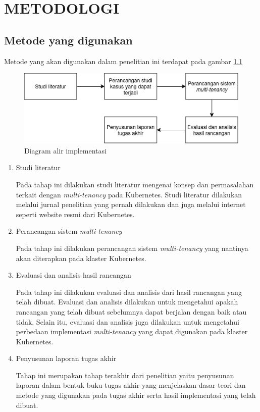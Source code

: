 \chapter{METODOLOGI}

\section{Metode yang digunakan}

Metode yang akan digunakan dalam penelitian ini terdapat pada gambar \ref{fig:Flowchart}

\begin{figure} [H] \centering
  \includegraphics[scale=0.7]{gambar/flowchart.png}
  \caption{Diagram alir implementasi}
  \label{fig:Flowchart}
\end{figure}

\begin{enumerate}
  \item{Studi literatur}
  \par{Pada tahap ini dilakukan studi literatur mengenai konsep dan permasalahan terkait
    dengan \emph{multi-tenancy} pada Kubernetes. Studi literatur dilakukan melalui jurnal penelitian
    yang pernah dilakukan dan juga melalui internet seperti website resmi dari Kubernetes.
  }

  \item{Perancangan sistem \emph{multi-tenancy}}
  \par{Pada tahap ini dilakukan perancangan sistem \emph{multi-tenancy} yang nantinya
    akan diterapkan pada klaster Kubernetes.
  }

  \item{Evaluasi dan analisis hasil rancangan}
  \par{Pada tahap ini dilakukan evaluasi dan analisis dari hasil rancangan yang telah
    dibuat. Evaluasi dan analisis dilakukan untuk mengetahui apakah rancangan yang
    telah dibuat sebelumnya dapat berjalan dengan baik atau tidak. Selain itu, evaluasi
    dan analisis juga dilakukan untuk mengetahui perbedaan implementasi \emph{multi-tenancy}
    yang dapat digunakan pada klaster Kubernetes.
  }

  \item{Penyusunan laporan tugas akhir}
  \par{Tahap ini merupakan tahap terakhir dari penelitian yaitu penyusunan laporan
    dalam bentuk buku tugas akhir yang menjelaskan dasar teori dan metode yang digunakan
    pada tugas akhir serta hasil implementasi yang telah dibuat.
  }
\end{enumerate}

